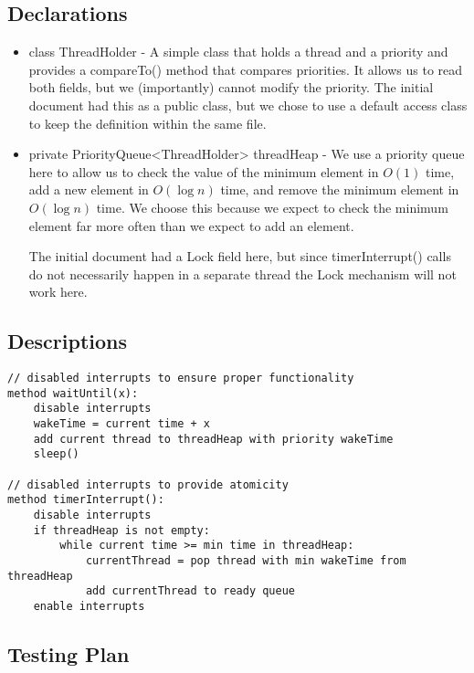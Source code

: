 \documentclass{article}
\begin{document}
\subsection{Declarations} %
\begin{itemize}
\item {\ttfamily class ThreadHolder} - A simple class that holds a thread and a priority and provides a compareTo() method that compares priorities. It allows us to read both fields, but we (importantly) cannot modify the priority. The initial document had this as a public class, but we chose to use a default access class to keep the definition within the same file.

\item {\ttfamily private PriorityQueue<ThreadHolder> threadHeap} - We use a priority queue here to allow us to check the value of the minimum element in $O(1)$ time, add a new element in $O(\log n)$ time, and remove the minimum element in $O(\log n)$ time. We choose this because we expect to check the minimum element far more often than we expect to add an element.

The initial document had a Lock field here, but since timerInterrupt() calls do not necessarily happen in a separate thread the Lock mechanism will not work here.
\end{itemize}

\subsection{Descriptions} %

\scriptsize
\begin{lstlisting}
// disabled interrupts to ensure proper functionality
method waitUntil(x):
    disable interrupts
    wakeTime = current time + x
    add current thread to threadHeap with priority wakeTime
    sleep()

// disabled interrupts to provide atomicity
method timerInterrupt():
    disable interrupts
    if threadHeap is not empty:
        while current time >= min time in threadHeap:
            currentThread = pop thread with min wakeTime from threadHeap
            add currentThread to ready queue
    enable interrupts
\end{lstlisting}
\normalsize

\subsection{Testing Plan}
\end{document}
